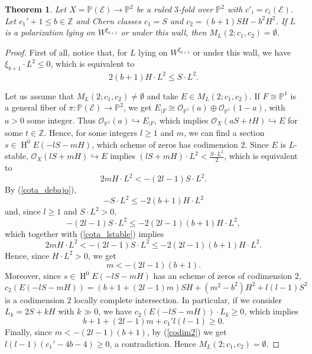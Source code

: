 \documentclass[11pt,twoside]{amsart}
\newtheorem{theorem}{Theorem}[section]
\theoremstyle{definition}
\newcommand{\Ho}{\operatorname{H}}
\begin{document}
\begin{theorem}
\label{th_vacio1}
    Let $X=\mathbb{P}(\mathcal{E})\rightarrow\mathbb{P}^2$ be a ruled $3$-fold  over $\mathbb{P}^2$ with $c'_i=c_i(\mathcal{E})$.  Let  $c_1'+1\leq b\in\mathbb{Z}$ and Chern classes $c_1=S$ and $c_2=(b+1)SH-b^2H^2$.  If $L$ is a polarization lying on $W^{\xi_{b+1}}$ or under this wall, then $M_{L}(2;c_1,c_2)=\emptyset$.
\end{theorem}

\begin{proof}

First of all, notice that, for $L$  lying on $W^{\xi_{b+1}}$ or under this wall, we have $\xi_{b+1}\cdot L^2\leq0$, which is equivalent to 
\begin{equation}
\label{cota_debajo}
    2(b+1) H\cdot L^2\leq S\cdot L^2.
\end{equation}

    Let us assume that $M_{L}(2;c_1,c_2)\neq \emptyset$ and take $E\in M_{L}(2;c_1,c_2)$. 
If $F\cong\mathbb{P}^1$ is a general fiber of $\pi:\mathbb{P}(\mathcal{E})\rightarrow\mathbb{P}^2$, we get $E_{|F}\cong \mathcal{O}_{\mathbb{P}^1}(a)\oplus \mathcal{O}_{\mathbb{P}^1}(1-a)$, with $a>0$ some integer. Thus $\mathcal{O}_{\mathbb{P}^1}(a)\hookrightarrow E_{|F}$, which implies $\mathcal{O}_X(aS+tH)\hookrightarrow E$ for some $t\in\mathbb{Z}$. Hence, for some integers $l\geq1$ and $m$, we can find a section $s\in\Ho^0E(-lS-mH)$, which scheme of zeros has codimension $2$.
    Since $E$ is $L$-stable, $\mathcal{O}_X(lS+mH)\hookrightarrow E$ implies $(lS+mH)\cdot L^2<\frac{S\cdot L^2}{2}$, which is equivalent to 
    \begin{equation}
    \label{cota_lstable}
        2m H\cdot L^2<-(2l-1)S\cdot L^2.
    \end{equation}
By (\ref{cota_debajo}), $$-S\cdot L^2\leq -2(b+1)H\cdot L^2$$ and, since $l\geq1$ and $S\cdot L^2>0$, $$-(2l-1)S\cdot L^2\leq -2(2l-1)(b+1)H\cdot L^2,$$ which together with (\ref{cota_lstable}) implies $$2m H\cdot L^2<-(2l-1)S\cdot L^2\leq -2(2l-1)(b+1)H\cdot L^2.$$ Hence, since $H\cdot L^2>0$, we get   $$m<-(2l-1)(b+1).$$   Moreover, since $s\in\Ho^0E(-lS-mH)$  has an scheme of zeros of codimension $2$, $$c_2(E(-lS-mH))= (b+1+(2l-1)m)SH+(m^2-b^2)H^2+l(l-1)S^2$$ is a codimension $2$ locally complete intersection. In particular, if we consider $L_k=2S+k H$ with $k\gg0$, we have $c_2(E(-lS-mH))\cdot L_k\geq0$, which implies
    \begin{equation}
    \label{codim2}
        b+1+(2l-1)m+c_1'l(l-1)\geq0.
    \end{equation}
Finally, since $m<-(2l-1)(b+1)$, by (\ref{codim2}) we get $l(l-1)(c_1'-4b-4)\geq0$, a contradiction. Hence $M_{L}(2;c_1,c_2)=\emptyset$.
\end{proof}
\end{document}
